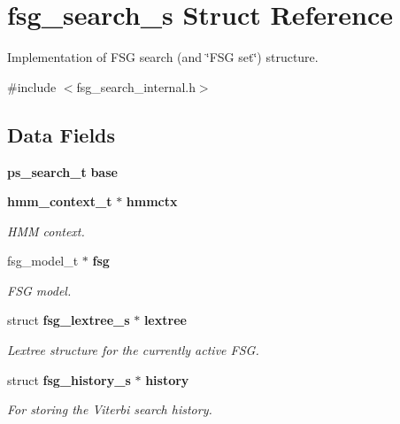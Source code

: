 \section{fsg\+\_\+search\+\_\+s Struct Reference}
\label{structfsg__search__s}


Implementation of F\+SG search (and \char`\"{}\+F\+S\+G set\char`\"{}) structure.  




{\ttfamily \#include $<$fsg\+\_\+search\+\_\+internal.\+h$>$}

\subsection*{Data Fields}
\begin{DoxyCompactItemize}
\item 
\mbox{\label{structfsg__search__s_a75f0e3fd5396d62616b9f84eab7ea355}} 
\textbf{ ps\+\_\+search\+\_\+t} {\bfseries base}
\item 
\textbf{ hmm\+\_\+context\+\_\+t} $\ast$ \textbf{ hmmctx}
\begin{DoxyCompactList}\small\item\em H\+MM context. \end{DoxyCompactList}\item 
\mbox{\label{structfsg__search__s_ab1877ffe7d77ddb79bab53fb95577946}} 
fsg\+\_\+model\+\_\+t $\ast$ \textbf{ fsg}
\begin{DoxyCompactList}\small\item\em F\+SG model. \end{DoxyCompactList}\item 
\mbox{\label{structfsg__search__s_ac2c756ff6c1a2f1059011756d22441f8}} 
struct \textbf{ fsg\+\_\+lextree\+\_\+s} $\ast$ \textbf{ lextree}
\begin{DoxyCompactList}\small\item\em Lextree structure for the currently active F\+SG. \end{DoxyCompactList}\item 
\mbox{\label{structfsg__search__s_abc949ccaab380bcf5b452d1cac54469b}} 
struct \textbf{ fsg\+\_\+history\+\_\+s} $\ast$ \textbf{ history}
\begin{DoxyCompactList}\small\item\em For storing the Viterbi search history. \end{DoxyCompactList}\item 
\mbox{\label{structfsg__search__s_a318ff42978c1e645f01962345ac08215}} 

\end{DoxyCompactItemize}
